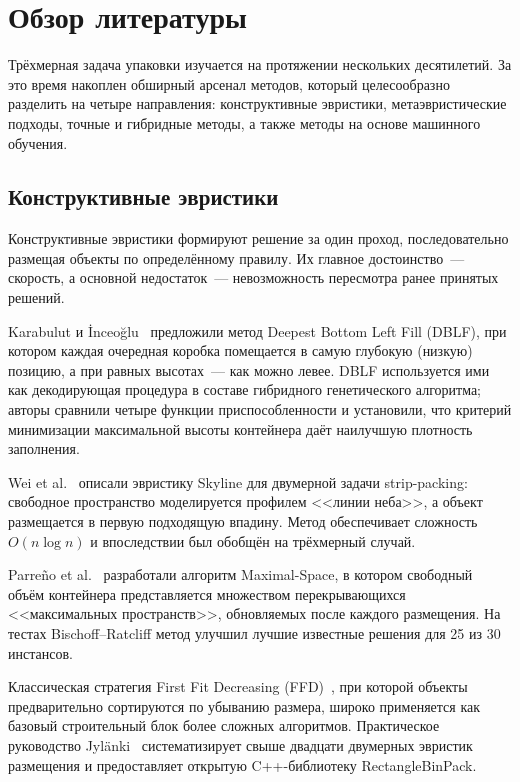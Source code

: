 \chapter{Обзор литературы}
\label{cha:Obzor}

Трёхмерная задача упаковки изучается на протяжении нескольких десятилетий. За это время накоплен обширный арсенал методов, который целесообразно разделить на четыре направления: конструктивные эвристики, метаэвристические подходы, точные и гибридные методы, а также методы на основе машинного обучения.

\section{Конструктивные эвристики}

Конструктивные эвристики формируют решение за один проход, последовательно размещая объекты по определённому правилу. Их главное достоинство~--- скорость, а основной недостаток~--- невозможность пересмотра ранее принятых решений.

Karabulut и İnceoğlu~\cite{karabulut} предложили метод Deepest Bottom Left Fill (DBLF), при котором каждая очередная коробка помещается в самую глубокую (низкую) позицию, а при равных высотах~--- как можно левее. DBLF используется ими как декодирующая процедура в составе гибридного генетического алгоритма; авторы сравнили четыре функции приспособленности и установили, что критерий минимизации максимальной высоты контейнера даёт наилучшую плотность заполнения.

Wei et al.~\cite{Wei2011} описали эвристику Skyline для двумерной задачи strip-packing: свободное пространство моделируется профилем <<линии неба>>, а объект размещается в первую подходящую впадину. Метод обеспечивает сложность $O(n\log n)$ и впоследствии был обобщён на трёхмерный случай.

Parreño et al.~\cite{Parreno2008} разработали алгоритм Maximal-Space, в котором свободный объём контейнера представляется множеством перекрывающихся <<максимальных пространств>>, обновляемых после каждого размещения. На тестах Bischoff--Ratcliff метод улучшил лучшие известные решения для 25 из 30 инстансов.

Классическая стратегия First Fit Decreasing (FFD)~\cite{CoffmanFFD1996}, при которой объекты предварительно сортируются по убыванию размера, широко применяется как базовый строительный блок более сложных алгоритмов. Практическое руководство Jylänki~\cite{Jylanki2010} систематизирует свыше двадцати двумерных эвристик размещения и предоставляет открытую C++-библиотеку RectangleBinPack.

